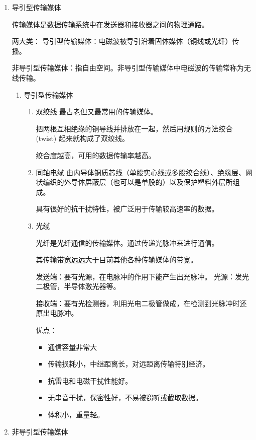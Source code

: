 \documentclass[11pt]{article}
\begin{document}
\begin{enumerate}
\item 导引型传输媒体
\label{sec:orgfa49b94}

传输媒体是数据传输系统中在发送器和接收器之间的物理通路。

两大类：
  导引型传输媒体：电磁波被导引沿着固体媒体（铜线或光纤）传播。

非导引型传输媒体：指自由空间。非导引型传输媒体中电磁波的传输常称为无线传输。
\begin{enumerate}
\item 导引型传输媒体
\label{sec:org04b387f}
\begin{enumerate}
\item 双绞线
最古老但又最常用的传输媒体。

把两根互相绝缘的铜导线并排放在一起，然后用规则的方法绞合 (twist) 起来就构成了双绞线。

绞合度越高，可用的数据传输率越高。

\item 同轴电缆
由内导体铜质芯线（单股实心线或多股绞合线）、绝缘层、网状编织的外导体屏蔽层（也可以是单股的）以及保护塑料外层所组成。

具有很好的抗干扰特性，被广泛用于传输较高速率的数据。

\item 光缆

光纤是光纤通信的传输媒体。通过传递光脉冲来进行通信。

其传输带宽远远大于目前其他各种传输媒体的带宽。

发送端：要有光源，在电脉冲的作用下能产生出光脉冲。
  光源：发光二极管，半导体激光器等。

接收端：要有光检测器，利用光电二极管做成，在检测到光脉冲时还原出电脉冲。

优点：
\begin{itemize}
\item 通信容量非常大

\item 传输损耗小，中继距离长，对远距离传输特别经济。

\item 抗雷电和电磁干扰性能好。

\item 无串音干扰，保密性好，不易被窃听或截取数据。

\item 体积小，重量轻。
\end{itemize}
\end{enumerate}
\end{enumerate}
\item 非导引型传输媒体
\label{sec:orgd8a3530}


\end{enumerate}
\end{document}
